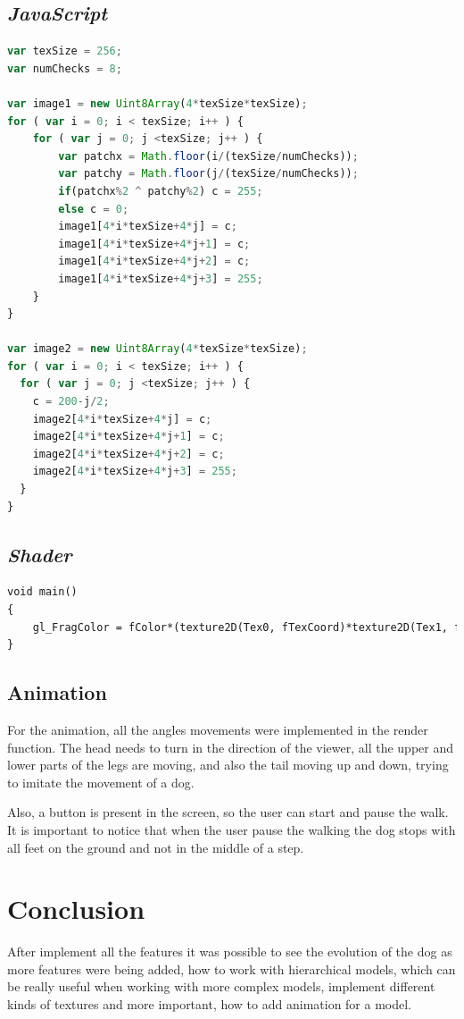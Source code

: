 \documentclass{article}
\begin{document}
\subsection*{\textit{JavaScript}}
\begin{lstlisting}[language=JavaScript]
var texSize = 256;
var numChecks = 8;

var image1 = new Uint8Array(4*texSize*texSize);
for ( var i = 0; i < texSize; i++ ) {
    for ( var j = 0; j <texSize; j++ ) {
        var patchx = Math.floor(i/(texSize/numChecks));
        var patchy = Math.floor(j/(texSize/numChecks));
        if(patchx%2 ^ patchy%2) c = 255;
        else c = 0;
        image1[4*i*texSize+4*j] = c;
        image1[4*i*texSize+4*j+1] = c;
        image1[4*i*texSize+4*j+2] = c;
        image1[4*i*texSize+4*j+3] = 255;
    }
}

var image2 = new Uint8Array(4*texSize*texSize);
for ( var i = 0; i < texSize; i++ ) {
  for ( var j = 0; j <texSize; j++ ) {
    c = 200-j/2;
    image2[4*i*texSize+4*j] = c;
    image2[4*i*texSize+4*j+1] = c;
    image2[4*i*texSize+4*j+2] = c;
    image2[4*i*texSize+4*j+3] = 255;
  }
}
\end{lstlisting}

\subsection*{\textit{Shader}}
\begin{lstlisting}[language=HTML]
void main()
{
    gl_FragColor = fColor*(texture2D(Tex0, fTexCoord)*texture2D(Tex1, fTexCoord));
}
\end{lstlisting}

\subsection {Animation}
For the animation, all the angles movements were implemented in the render function. The head needs to turn in the direction of the viewer, all the upper and lower parts of the legs are moving, and also the tail moving up and down, trying to imitate the movement of a dog.

Also, a button is present in the screen, so the user can start and pause the walk. It is important to notice that when the user pause the walking the dog stops with all feet on the ground and not in the middle of a step.

\section{Conclusion}
After implement all the features it was possible to see the evolution of the dog as more features were being added, how to work with hierarchical models, which can be really useful when working with more complex models, implement different kinds of textures and more important, how to add animation for a model.
\end{document}
